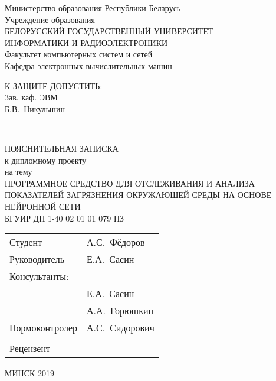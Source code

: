   \begin{center}
    Министерство образования Республики Беларусь\\[1em]
    Учреждение образования\\
    БЕЛОРУССКИЙ ГОСУДАРСТВЕННЫЙ УНИВЕРСИТЕТ \\
    ИНФОРМАТИКИ И РАДИОЭЛЕКТРОНИКИ\\[1em]

    Факультет компьютерных систем и сетей \\[0.6cm]

    Кафедра электронных вычислительных машин \\[1.4cm]

    \begin{flushright}
      \begin{minipage}{0.4\textwidth}
        \MakeUppercase{К защите допустить:}\\
        Зав. каф. ЭВМ\\
        \underline{\hspace*{2.2cm}} Б.В.~Никульшин
      \end{minipage}\\[3.2em]
    \end{flushright}

    {ПОЯСНИТЕЛЬНАЯ ЗАПИСКА}\\
    {к дипломному проекту}\\
    {на тему}\\
    {\MakeUppercase{Программное средство для отслеживания и анализа показателей загрязнения окружающей среды на основе нейронной сети}}\\[2em]


    {БГУИР ДП 1-40 02 01 01 079 ПЗ}\\[2em]

    \begin{tabular}{ p{}p{} }
      Студент & А.С.~Фёдоров  \\[1em]

      Руководитель & Е.А.~Сасин \\[1em]

      Консультанты: &\\[1em]

      \hspace*{6ex}{от кафедры ЭВМ} & Е.А.~Сасин \\[1em]

      \hspace*{6ex}{по экономической части} & А.А.~Горюшкин \\[1em]

      Нормоконтролер & А.С.~Сидорович\\
      & \\
      Рецензент &
    \end{tabular}

    \vfill
    {\normalsize МИНСК 2019}
  \end{center}

  \newpage
